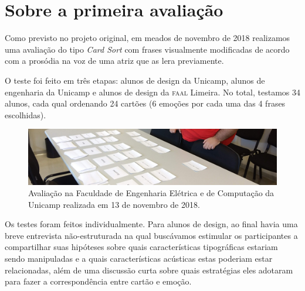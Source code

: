 \documentclass[a4paper,11pt,titlepage,singlespacing]{article}
\begin{document}
{\color{pos_parecer}

    \newpage


    \section{Sobre a primeira avaliação}
    \label{sec:n_avaliacao_1}

    Como previsto no projeto original, em meados de novembro de 2018 realizamos uma avaliação do tipo \textit{Card Sort} com frases visualmente modificadas de acordo com a prosódia na voz de uma atriz que as lera previamente. 
    
    O teste foi feito em três etapas: alunos de design da Unicamp, alunos de engenharia da Unicamp e alunos de design da \textsc{faal} Limeira. No total, testamos 34 alunos, cada qual ordenando 24 cartões (6 emoções por cada uma das 4 frases escolhidas).
    
    
    \begin{figure}[!ht]    
        \centering
        \label{fig:card_sort}
        \captionsetup{width=\textwidth}
            \includegraphics[width=1\textwidth]{fig/card_sort.jpg}
            
        \caption{Avaliação na Faculdade de Engenharia Elétrica e de Computação da Unicamp realizada em 13 de novembro de 2018.}
    \end{figure}
    

    
    Os testes foram feitos individualmente. Para alunos de design, ao final havia uma breve entrevista não-estruturada na qual buscávamos estimular os participantes a compartilhar suas hipóteses sobre quais características tipográficas estariam sendo manipuladas e a quais características acústicas estas poderiam estar relacionadas, além de uma discussão curta sobre quais estratégias eles adotaram para fazer a correspondência entre cartão e emoção.
    
}
\end{document}
